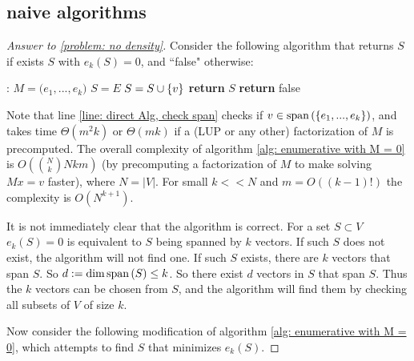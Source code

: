 \documentclass{article}
\begin{document}
\subsection{naive algorithms}
\begin{proof}[Answer to \ref{problem: no density}]
Consider the following algorithm that returns $S$ if exists $S$ with $e_k(S) = 0$, and ``false" otherwise:
\begin{algorithm}[H]
      \caption{}\label{alg: enumerative with M = 0}
    \begin{algorithmic}[1]
    :
        \State $M = \Big(e_1,...,e_k\Big)$
        \State $S = E$
            \label{line: direct Alg, check span}
                \State $S = S\cup \left\{v\right\}$
            \EndIf
        \EndFor
            \State \textbf{return} $S$
        \EndIf
    \EndFor
    \State \textbf{return} false
    \EndProcedure
    \end{algorithmic}
\end{algorithm}

Note that line \ref{line: direct Alg, check span} checks if $v\in \text{span}\left(\left\{e_1,...,e_k\right\}\right)$, and takes time $\Theta(m^2k)$ or $\Theta(mk)$ if a (LUP or any other) factorization of $M$ is precomputed. The overall complexity of algorithm \ref{alg: enumerative with M = 0} is $O(\binom{N}{k}Nkm)$ (by precomputing a factorization of $M$ to make solving $Mx=v$ faster), where $N = |V|$. For small $k<<N$ and $m = O((k-1)!)$ the complexity is $O(N^{k+1})$.

It is not immediately clear that the algorithm is correct. For a set $S\subset V$ $e_k(S)=0$ is equivalent to $S$ being spanned by $k$ vectors. If such $S$ does not exist, the algorithm will not find one. If such $S$ exists, there are $k$ vectors that span $S$. So $d := \dim \text{span}\left(S\right) \leq k$. So there exist $d$ vectors in $S$ that span $S$. Thus the $k$ vectors can be chosen from $S$, and the algorithm will find them by checking all subsets of $V$ of size $k$.

Now consider the following modification of algorithm \ref{alg: enumerative with M = 0}, which attempts to find $S$ that minimizes $e_k(S)$.


\end{proof}
\end{document}
